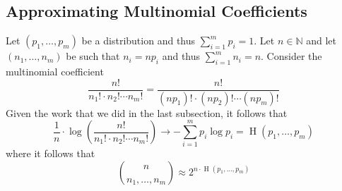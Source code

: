 \documentclass{article}
\begin{document}
\subsection{Approximating Multinomial Coefficients}

Let $\left(p_1,\ldots, p_m\right)$ be a distribution and thus $\sum_{i=1 }^{m }p_i =1$. Let $n\in \mathbb{N}$ and let $\left(n_1,\ldots,n_m\right)$ be such that $n_i=np_i$ and thus $\sum_{i=1 }^{m }n_i=n$. Consider the multinomial coefficient 
\[
\frac{n!}{n_1!\cdot n_2!\cdots n_m!}=\frac{n!}{\left(np_1\right)!\cdot \left(np_2\right)!\cdots \left(np_m\right)!}
\]
Given the work that we did in the last subsection, it follows that 
\[
\frac{1}{n}\cdot \log \left(\frac{n!}{n_1!\cdot n_2!\cdots n_m!}\right) \rightarrow -\sum_{i=1 }^{m }p_i\log p_i = \operatorname{H}\left(p_1,\ldots,p_m\right)
\]
where it follows that 
\[
\binom{n }{n_1,\ldots,n_m}\approx 2^{n\cdot \operatorname{H}\left(p_1,\ldots,p_m\right)}
\]
\end{document}

